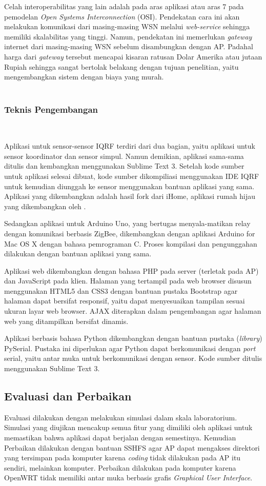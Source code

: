 		Celah interoperabilitas yang lain adalah pada aras aplikasi atau aras 7 pada pemodelan \emph{Open Systems Interconnection} (OSI). Pendekatan cara ini akan melakukan komunikasi dari masing-masing WSN melalui \emph{web-service} sehingga memiliki skalabilitas yang tinggi. Namun, pendekatan ini memerlukan \emph{gateway} internet dari masing-masing WSN sebelum disambungkan dengan AP. Padahal harga dari \emph{gateway} tersebut mencapai kisaran ratusan Dolar Amerika atau jutaan Rupiah sehingga sangat bertolak belakang dengan tujuan penelitian, yaitu mengembangkan sistem dengan biaya yang murah.\\ \\

		\subsubsection{Teknis Pengembangan} \

		Aplikasi untuk sensor-sensor IQRF terdiri dari dua bagian, yaitu aplikasi untuk sensor koordinator dan sensor simpul. Namun demikian, aplikasi sama-sama ditulis dan kembangkan menggunakan Sublime Text 3. Setelah kode sumber untuk aplikasi selesai dibuat, kode sumber dikompiliasi menggunakan IDE IQRF untuk kemudian diunggah ke sensor menggunakan bantuan aplikasi yang sama. Aplikasi yang dikembangkan adalah hasil fork dari iHome, aplikasi rumah hijau yang dikembangkan oleh \cite{widyawan2012ihome}.

		Sedangkan aplikasi untuk Arduino Uno, yang bertugas menyala-matikan relay dengan komunikasi berbasis ZigBee, dikembangkan dengan aplikasi Arduino for Mac OS X dengan bahasa pemrograman C. Proses kompilasi dan pengunggahan dilakukan dengan bantuan aplikasi yang sama.

		Aplikasi web dikembangkan dengan bahasa PHP pada server (terletak pada AP) dan JavaScript pada klien. Halaman yang tertampil pada web browser disusun menggunakan HTML5 dan CSS3 dengan bantuan pustaka Bootstrap agar halaman dapat bersifat responsif, yaitu dapat menyesuaikan tampilan sesuai ukuran layar web browser. AJAX diterapkan dalam pengembangan agar halaman web yang ditampilkan bersifat dinamis.

		Aplikasi berbasis bahasa Python dikembangkan dengan bantuan pustaka (\emph{library}) PySerial. Pustaka ini diperlukan agar Python dapat berkomunikasi dengan \emph{port} serial, yaitu antar muka untuk berkomunikasi dengan sensor. Kode sumber ditulis menggunakan Sublime Text 3.

	\subsection{Evaluasi dan Perbaikan}
		Evaluasi dilakukan dengan melakukan simulasi dalam skala laboratorium. Simulasi yang diujikan mencakup semua fitur yang dimiliki oleh aplikasi untuk memastikan bahwa aplikasi dapat berjalan dengan semestinya. Kemudian Perbaikan dilakukan dengan bantuan SSHFS agar AP dapat mengakses direktori yang tersimpan pada komputer karena \emph{coding} tidak dilakukan pada AP itu sendiri, melainkan komputer. Perbaikan dilakukan pada komputer karena OpenWRT tidak memiliki antar muka berbasis grafis \emph{Graphical User Interface}.

